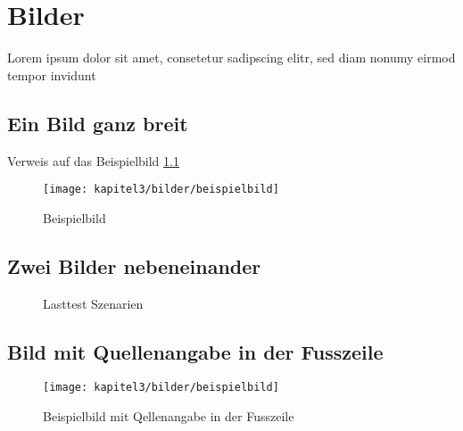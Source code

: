 
\chapter{Bilder}

Lorem ipsum dolor sit amet, consetetur sadipscing elitr, sed diam nonumy eirmod tempor invidunt 
\section{Ein Bild ganz breit} 
Verweis auf das Beispielbild \ref{fig:zuul}

\begin{figure}[htbp]
 \centering
 \texttt{[image: kapitel3/bilder/beispielbild]}
 \caption{Beispielbild}
 \label{fig:zuul}
\end{figure}


\section{Zwei Bilder nebeneinander} 


\begin{figure}
\hfill
{}
\caption{Lasttest Szenarien}
\end{figure}

\section{Bild mit Quellenangabe in der Fusszeile}

\begin{figure}[htbp]
    \centering
	\texttt{[image: kapitel3/bilder/beispielbild]}
	\caption[Beispielbild mit Qellenangabe in der Fusszeile]{Beispielbild mit Qellenangabe in der Fusszeile\protect\footnotemark}
\end{figure}
